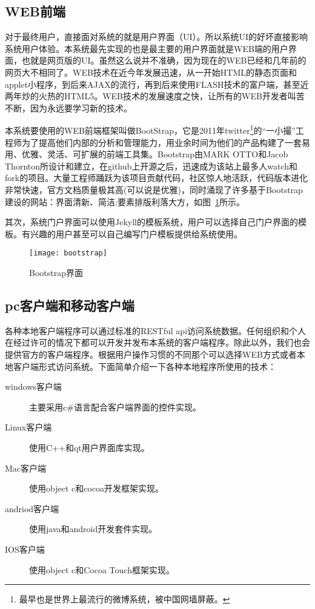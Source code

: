 \subsection{WEB前端}
\label{sec:webui}

对于最终用户，直接面对系统的就是用户界面（UI）。所以系统UI的好坏直接影响系统用户体验。本系统最先实现的也是最主要的用户界面就是WEB端的用户界面，也就是网页版的UI。虽然这么说并不准确，因为现在的WEB已经和几年前的网页大不相同了。WEB技术在近今年发展迅速，从一开始HTML的静态页面和applet小程序，到后来AJAX的流行，再到后来使用FLASH技术的富户端，甚至近两年炒的火热的HTML5。WEB技术的发展速度之快，让所有的WEB开发者叫苦不断，因为永远要学习新的技术。

本系统要使用的WEB前端框架叫做BootStrap，它是2011年twitter\footnote{最早也是世界上最流行的微博系统，被中国网墙屏蔽。}的“一小撮”工程师为了提高他们内部的分析和管理能力，用业余时间为他们的产品构建了一套易用、优雅、灵活、可扩展的前端工具集。Bootstrap由MARK OTTO和Jacob Thornton所设计和建立，在github上开源之后，迅速成为该站上最多人watch和fork的项目。大量工程师踊跃为该项目贡献代码，社区惊人地活跃，代码版本进化非常快速，官方文档质量极其高(可以说是优雅)，同时涌现了许多基于Bootstrap建设的网站：界面清新、简洁;要素排版利落大方，如图~\ref{fig:xfig14}所示。

其次，系统门户界面可以使用Jekyll的模板系统，用户可以选择自己门户界面的模板。有兴趣的用户甚至可以自己编写门户模板提供给系统使用。

\begin{figure}[H]
  \centering
  \texttt{[image: bootstrap]}
  \caption{Bootstrap界面}
  \label{fig:xfig14}
\end{figure}

\subsection{pc客户端和移动客户端}
\label{sec:pcandriodmac}

各种本地客户端程序可以通过标准的RESTful api访问系统数据。任何组织和个人在经过许可的情况下都可以开发并发布本系统的客户端程序。除此以外，我们也会提供官方的客户端程序。根据用户操作习惯的不同那个可以选择WEB方式或者本地客户端形式访问系统。下面简单介绍一下各种本地程序所使用的技术：
\begin{description}
\item[windows客户端] 主要采用c\#语言配合客户端界面的控件实现。
\item[Linux客户端] 使用C++和qt用户界面库实现。
\item[Mac客户端] 使用object c和cocoa开发框架实现。
\item[andriod客户端] 使用java和android开发套件实现。
\item[IOS客户端] 使用object c和Cocoa Touch框架实现。
\end{description}

